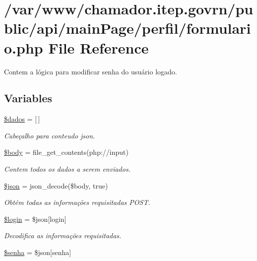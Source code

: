 \hypertarget{formulario_8php}{}\section{/var/www/chamador.itep.\+govrn/public/api/main\+Page/perfil/formulario.php File Reference}
\label{formulario_8php}


Contem a lógica para modificar senha do usuário logado.  


\subsection*{Variables}
\begin{DoxyCompactItemize}
\item 
\hyperlink{formulario_8php_a252370d95039a38fa11afab784725d58}{\$dados} = \mbox{[}$\,$\mbox{]}
\begin{DoxyCompactList}\small\item\em Cabeçalho para conteudo json. \end{DoxyCompactList}\item 
\hyperlink{formulario_8php_a26b9f9373f7bb79dfcf8a86dff086b45}{\$body} = file\+\_\+get\+\_\+contents(\textquotesingle{}php\+://input\textquotesingle{})
\begin{DoxyCompactList}\small\item\em Contem todos os dados a serem enviados. \end{DoxyCompactList}\item 
\hyperlink{formulario_8php_acedd13b51401130848ce18f4d5c52605}{\$json} = json\+\_\+decode(\$body, true)
\begin{DoxyCompactList}\small\item\em Obtém todas as informações requisitadas P\+O\+ST. \end{DoxyCompactList}\item 
\hyperlink{formulario_8php_afc31993e855f9631572adfedcfe6f34b}{\$login} = \$json\mbox{[}\textquotesingle{}login\textquotesingle{}\mbox{]}
\begin{DoxyCompactList}\small\item\em Decodifica as informações requisitadas. \end{DoxyCompactList}\item 
\hyperlink{formulario_8php_a3678c8769c9698fd30581c1016c5f475}{\$senha} = \$json\mbox{[}\textquotesingle{}senha\textquotesingle{}\mbox{]}

\end{DoxyCompactItemize}
